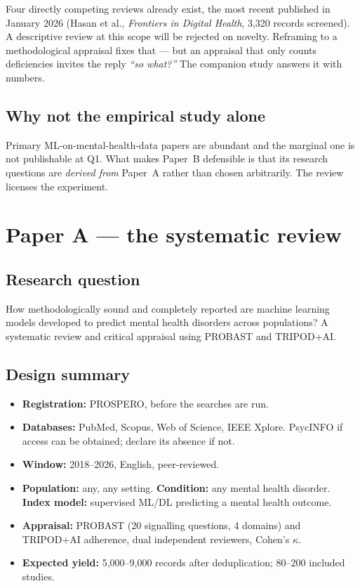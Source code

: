 \documentclass[11pt,a4paper]{article}
\begin{document}
Four directly competing reviews already exist, the most recent published in
January 2026 (Hasan et al., \emph{Frontiers in Digital Health}, 3{,}320
records screened). A descriptive review at this scope will be rejected on
novelty. Reframing to a methodological appraisal fixes that --- but an
appraisal that only counts deficiencies invites the reply
\emph{``so what?''} The companion study answers it with numbers.

\subsection{Why not the empirical study alone}

Primary ML-on-mental-health-data papers are abundant and the marginal one is
not publishable at Q1. What makes Paper~B defensible is that its research
questions are \emph{derived from} Paper~A rather than chosen arbitrarily.
The review licenses the experiment.

\section{Paper A --- the systematic review}

\subsection{Research question}

How methodologically sound and completely reported are machine learning
models developed to predict mental health disorders across populations?
A systematic review and critical appraisal using PROBAST and TRIPOD+AI.

\subsection{Design summary}

\begin{itemize}
  \item \textbf{Registration:} PROSPERO, before the searches are run.
  \item \textbf{Databases:} PubMed, Scopus, Web of Science, IEEE Xplore.
        PsycINFO if access can be obtained; declare its absence if not.
  \item \textbf{Window:} 2018--2026, English, peer-reviewed.
  \item \textbf{Population:} any, any setting. \textbf{Condition:} any mental
        health disorder. \textbf{Index model:} supervised ML/DL predicting a
        mental health outcome.
  \item \textbf{Appraisal:} PROBAST (20 signalling questions, 4 domains) and
        TRIPOD+AI adherence, dual independent reviewers, Cohen's $\kappa$.
  \item \textbf{Expected yield:} 5{,}000--9{,}000 records after
        deduplication; 80--200 included studies.
\end{itemize}
\end{document}
